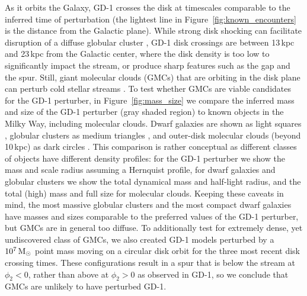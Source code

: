 \documentclass[twocolumn]{aastex62}
\begin{document}

As it orbits the Galaxy, GD-1 crosses the disk at timescales comparable to the inferred time of perturbation (the lightest line in Figure~\ref{fig:known_encounters} is the distance from the Galactic plane).
While strong disk shocking can facilitate disruption of a diffuse globular cluster \citep{dehnen2004}, GD-1 disk crossings are between 13\,kpc and 23\,kpc from the Galactic center, where the disk density is too low to significantly impact the stream, or produce sharp features such as the gap and the spur.
Still, giant molecular clouds (GMCs) that are orbiting in the disk plane can perturb cold stellar streams \citep{amorisco2016}.
To test whether GMCs are viable candidates for the GD-1 perturber, in Figure~\ref{fig:mass_size} we compare the inferred mass and size of the GD-1 perturber (gray shaded region) to known objects in the Milky Way, including molecular clouds.
Dwarf galaxies are shown as light squares \citep{mcconnachie2012}, globular clusters as medium triangles \citep{baumgardt2018}, and outer-disk molecular clouds (beyond 10\,kpc) as dark circles \citep{md2017}.
This comparison is rather conceptual as different classes of objects have different density profiles: for the GD-1 perturber we show the mass and scale radius assuming a Hernquist profile, for dwarf galaxies and globular clusters we show the total dynamical mass and half-light radius, and the total (high) mass and full size for molecular clouds.
Keeping these caveats in mind, the most massive globular clusters and the most compact dwarf galaxies have masses and sizes comparable to the preferred values of the GD-1 perturber, but GMCs are in general too diffuse.
To additionally test for extremely dense, yet undiscovered class of GMCs, we also created GD-1 models perturbed by a $10^7\,\rm M_\odot$ point mass moving on a circular disk orbit for the three most recent disk crossing times.
These configurations result in a spur that is below the stream at $\phi_2<0$, rather than above at $\phi_2>0$ as observed in GD-1, so we conclude that GMCs are unlikely to have perturbed GD-1.
\end{document}
